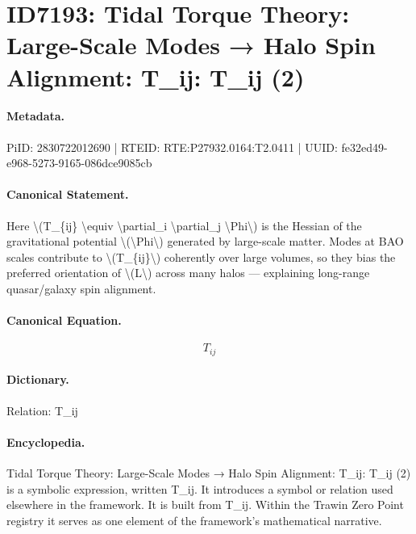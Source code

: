\section*{ID7193: Tidal Torque Theory: Large-Scale Modes → Halo Spin Alignment: T\_ij: T\_ij (2)}
\paragraph{Metadata.}
PiID: 2830722012690 | RTEID: RTE:P27932.0164:T2.0411 | UUID: fe32ed49-e968-5273-9165-086dce9085cb

\paragraph{Canonical Statement.}
Here \textbackslash{}(T\_\{ij\} \textbackslash{}equiv \textbackslash{}partial\_i \textbackslash{}partial\_j \textbackslash{}Phi\textbackslash{}) is the Hessian of the gravitational potential \textbackslash{}(\textbackslash{}Phi\textbackslash{}) generated by large-scale matter. Modes at BAO scales contribute to \textbackslash{}(T\_\{ij\}\textbackslash{}) coherently over large volumes, so they bias the preferred orientation of \textbackslash{}(L\textbackslash{}) across many halos — explaining long-range quasar/galaxy spin alignment.

\paragraph{Canonical Equation.}
\[
T_{ij}
\]

\paragraph{Dictionary.}
Relation: T\_ij

\paragraph{Encyclopedia.}
Tidal Torque Theory: Large-Scale Modes → Halo Spin Alignment: T\_ij: T\_ij (2) is a symbolic expression, written T\_ij. It introduces a symbol or relation used elsewhere in the framework. It is built from T\_ij. Within the Trawin Zero Point registry it serves as one element of the framework's mathematical narrative.
